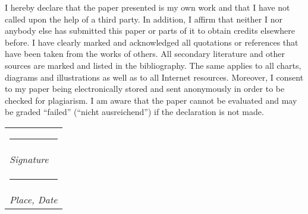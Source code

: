 \documentclass[11pt, a4paper]{article} %
\makeatletter
\newcommand{\signature}[2][5cm]{%
  \begin{tabular}{@{}p{#1}@{}}
    #2 \\[2\normalbaselineskip] \hrule \\[0pt]
    {\small \textit{Signature}} \\[2\normalbaselineskip] \hrule \\[0pt]
    {\small \textit{Place, Date}}
  \end{tabular}
}
\makeatother
\begin{document}
\vspace*{1in} %

\noindent I hereby declare that the paper presented is my own work and that I have not called upon the help of a third party. In addition, I affirm that neither I nor anybody else has submitted this paper or parts of it to obtain credits elsewhere before. I have clearly marked and acknowledged all quotations or references that have been taken from the works of others. All secondary literature and other sources are marked and listed in the bibliography. The same applies to all charts, diagrams and illustrations as well as to all Internet resources. Moreover, I consent to my paper being electronically stored and sent anonymously in order to be checked for plagiarism. I am aware that the paper cannot be evaluated and may be graded ``failed'' (``nicht ausreichend'') if the declaration is not made.\\


\hfill \signature{} 


\end{document}
